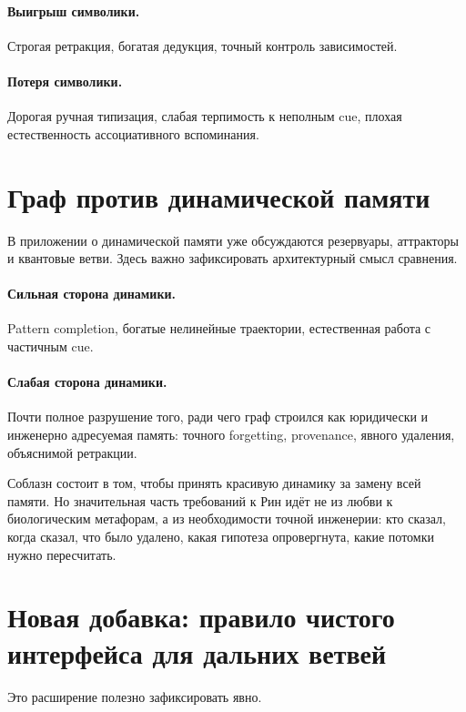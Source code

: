 \paragraph{Выигрыш символики.}
Строгая ретракция, богатая дедукция, точный контроль зависимостей.

\paragraph{Потеря символики.}
Дорогая ручная типизация, слабая терпимость к неполным cue, плохая естественность
ассоциативного вспоминания.

\section{Граф против динамической памяти}

В приложении о динамической памяти уже обсуждаются резервуары, аттракторы и квантовые
ветви. Здесь важно зафиксировать архитектурный смысл сравнения.

\paragraph{Сильная сторона динамики.}
Pattern completion, богатые нелинейные траектории, естественная работа с частичным cue.

\paragraph{Слабая сторона динамики.}
Почти полное разрушение того, ради чего граф строился как юридически и инженерно
адресуемая память: точного forgetting, provenance, явного удаления, объяснимой
ретракции.

\begin{pitfall}
Соблазн состоит в том, чтобы принять красивую динамику за замену всей памяти.
Но значительная часть требований к Рин идёт не из любви к биологическим метафорам,
а из необходимости точной инженерии: кто сказал, когда сказал, что было удалено,
какая гипотеза опровергнута, какие потомки нужно пересчитать.
\end{pitfall}

\section{Новая добавка: правило чистого интерфейса для дальних ветвей}

Это расширение полезно зафиксировать явно.

